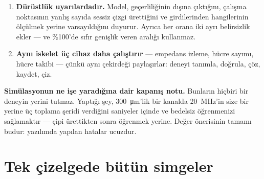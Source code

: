 \documentclass[11pt,a4paper]{article}
\begin{document}
\begin{enumerate}[leftmargin=*,itemsep=6pt]
\item \textbf{Dürüstlük uyarılardadır.} Model, geçerliliğinin dışına çıktığını,
çalışma noktasının yanlış sayıda sessiz çizgi ürettiğini ve girdilerinden
hangilerinin ölçülmek yerine varsayıldığını duyurur. Ayrıca her orana iki ayrı
belirsizlik ekler --- ve \%100'de sıfır genişlik veren aralığı kullanmaz.

\item \textbf{Aynı iskelet üç cihaz daha çalıştırır} --- empedans izleme, hücre
sayımı, hücre takibi --- çünkü aynı çekirdeği paylaşırlar: deneyi tanımla,
doğrula, çöz, kaydet, çiz.
\end{enumerate}

\vfill

\begin{center}
\begin{minipage}{0.9\textwidth}
\small\color{muted}
\textbf{Simülasyonun ne işe yaradığına dair kapanış notu.} Bunların hiçbiri bir
deneyin yerini tutmaz. Yaptığı şey, \SI{300}{\micro\meter}'lik bir kanalda
\SI{20}{\mega\hertz}'in size bir yerine üç toplama şeridi verdiğini saniyeler
içinde ve bedelsiz öğrenmenizi sağlamaktır --- çipi ürettikten sonra öğrenmek
yerine. Değer önerisinin tamamı budur: yazılımda yapılan hatalar ucuzdur.
\end{minipage}
\end{center}

\clearpage
\appendix
\section{Tek çizelgede bütün simgeler}
\end{document}
